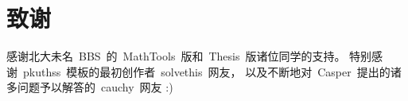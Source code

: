 \chapter{致谢}

感谢北大未名~BBS~的~MathTools~版和~Thesis~版诸位同学的支持。
特别感谢~pkuthss~模板的最初创作者~solvethis~网友，
以及不断地对~Casper~提出的诸多问题予以解答的~cauchy~网友 :)

